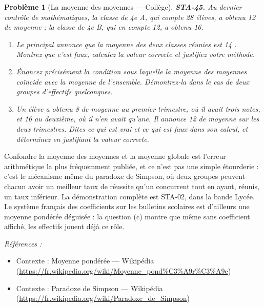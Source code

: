 \documentclass[11pt]{article}
\newtheorem{problem}{Problème}
\newenvironment{refs}{\par\small\noindent\emph{Références :}\begin{itemize}\setlength\itemsep{0pt}}{\end{itemize}\normalsize}
\begin{document}
\bigskip

\begin{problem}[{La moyenne des moyennes --- Collège}]
\textbf{STA-45.} Au dernier contrôle de mathématiques, la classe de 4e A, qui compte
28 élèves, a obtenu 12 de moyenne ; la classe de 4e B, qui en compte 12, a obtenu 16.
\begin{enumerate}
\item[(a)] Le principal annonce que \og{} la moyenne des deux classes réunies est 14 \fg{}. Montrez que c'est
faux, calculez la valeur correcte et justifiez votre méthode.
\item[(b)] Énoncez précisément la condition sous laquelle la moyenne des moyennes coïncide avec la
moyenne de l'ensemble. Démontrez-la dans le cas de deux groupes d'effectifs quelconques.
\item[(c)] Un élève a obtenu 8 de moyenne au premier trimestre, où il avait trois notes, et 16 au
deuxième, où il n'en avait qu'une. Il annonce 12 de moyenne sur les deux trimestres. Dites ce qui
est vrai et ce qui est faux dans son calcul, et déterminez en justifiant la valeur correcte.
\end{enumerate}

\end{problem}

\noindent Confondre la moyenne des moyennes et la moyenne globale est l'erreur
arithmétique la plus fréquemment publiée, et ce n'est pas une simple étourderie : c'est le
mécanisme même du paradoxe de Simpson, où deux groupes peuvent chacun avoir un meilleur taux de
réussite qu'un concurrent tout en ayant, réunis, un taux inférieur. La démonstration complète est
STA-02, dans la bande Lycée. Le système français des coefficients sur les bulletins scolaires est
d'ailleurs une moyenne pondérée déguisée : la question (c) montre que même sans coefficient
affiché, les effectifs jouent déjà ce rôle.

\begin{refs}
\item Contexte : Moyenne pondérée --- Wikipédia (\url{https://fr.wikipedia.org/wiki/Moyenne_pond%C3%A9r%C3%A9e})
\item Contexte : Paradoxe de Simpson --- Wikipédia (\url{https://fr.wikipedia.org/wiki/Paradoxe_de_Simpson})
\end{refs}

\bigskip
\end{document}
